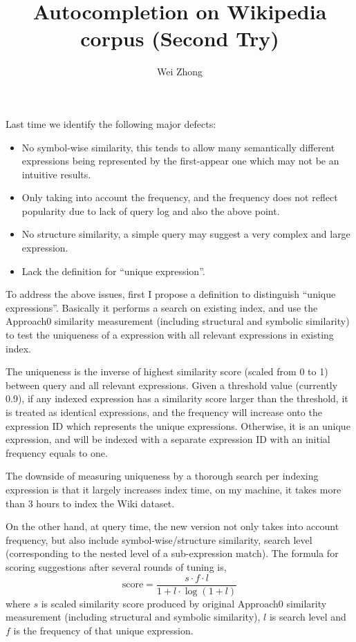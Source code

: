 \documentclass[12pt]{article} %
\begin{document}
\title{Autocompletion on Wikipedia corpus (Second Try)}
\author{Wei Zhong}
\maketitle

Last time we identify the following major defects:
\begin{itemize}
\item No symbol-wise similarity, this tends to allow many semantically different expressions being represented by the first-appear one which may not be an intuitive results.
\item Only taking into account the frequency, and the frequency does not reflect popularity due to lack of query log and also the above point.
\item No structure similarity, a simple query may suggest a very complex and large expression.
\item Lack the definition for ``unique expression''.
\end{itemize}

To address the above issues, first I propose a definition to distinguish ``unique expressions''.
Basically it performs a search on existing index, and use the Approach0 similarity measurement (including structural and symbolic similarity)
to test the uniqueness of a expression with all relevant expressions in existing index.

The uniqueness is the inverse of highest similarity score (scaled from 0 to 1) between query and all relevant expressions.
Given a threshold value (currently 0.9), if any indexed expression has a similarity score larger than the threshold, it is treated as identical expressions, and the frequency will
increase onto the expression ID which represents the unique expressions.
Otherwise, it is an unique expression, and will be indexed with a separate expression ID with an initial frequency equals to one.

The downside of measuring uniqueness by a thorough search per indexing expression is that it largely increases index time, on my machine, it takes more than 3 hours to index the Wiki dataset.

On the other hand, at query time, the new version not only takes into account frequency, but also include symbol-wise/structure similarity, search level (corresponding to the nested level
of a sub-expression match).
The formula for scoring suggestions after several rounds of tuning is,
$$
\text{score} = \frac{s \cdot f \cdot l }{1 + l \cdot \log(1 + l)}
$$
where $s$ is scaled similarity score produced by original  Approach0 similarity measurement (including structural and symbolic similarity),
$l$ is search level and $f$ is the frequency of that unique expression.
\end{document}

